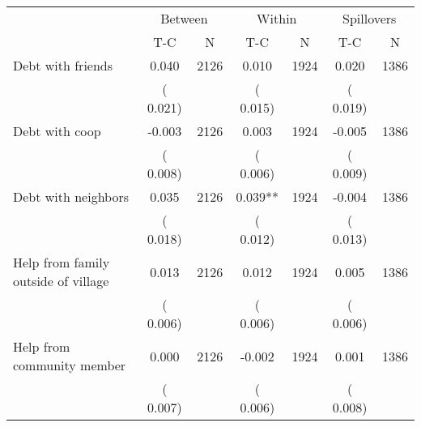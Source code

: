 
\begin{tabular}{l*{6}{c}}\hline&\multicolumn{2}{c}{Between}&\multicolumn{2}{c}{Within}&\multicolumn{2}{c}{Spillovers} \\ \cmidrule(r){2-3}\cmidrule(l){4-5}\cmidrule(l){6-7} & {T-C} & {N} & {T-C} & {N}  & {T-C}  & {N}  \\ \midrule
Debt with friends        &              0.040      &       2126       &              0.010      &       1924       &              0.020      &       1386       \\
                       &       (       0.021)            &                               &       (       0.015)            &                               &       (       0.019)            &                               \\
Debt with coop        &             -0.003      &       2126       &              0.003      &       1924       &             -0.005      &       1386       \\
                       &       (       0.008)            &                               &       (       0.006)            &                               &       (       0.009)            &                               \\
Debt with neighbors        &              0.035      &       2126       &              0.039**      &       1924       &             -0.004      &       1386       \\
                       &       (       0.018)            &                               &       (       0.012)            &                               &       (       0.013)            &                               \\
Help from family outside of village        &              0.013      &       2126       &              0.012      &       1924       &              0.005      &       1386       \\
                       &       (       0.006)            &                               &       (       0.006)            &                               &       (       0.006)            &                               \\
Help from community member        &              0.000      &       2126       &             -0.002      &       1924       &              0.001      &       1386       \\
                       &       (       0.007)            &                               &       (       0.006)            &                               &       (       0.008)            &                               \\

\end{tabular}
